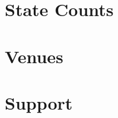 \documentclass[8pt]{book}
\makeatletter
\let\mcnewpage=\newpage
\newcommand{\TrickSupertabularIntoMulticols}{
  \renewcommand\newpage{
    \if@firstcolumn
      \hrule width\linewidth height0pt
      \columnbreak
    \else
      \mcnewpage
    \fi
  }
}
\makeatother
\begin{document}



\chapter{State Counts}




\chapter{Venues}



\chapter{Support}

\begin{multicols*}{3}
\TrickSupertabularIntoMulticols
\noindent

\end{multicols*}
\end{document}
